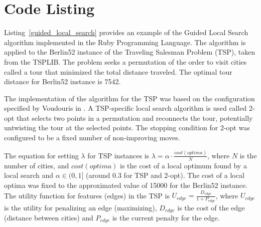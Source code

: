 \documentclass[a4paper, 11pt]{article}
\begin{document}
\section{Code Listing}
\label{sec:code}
Listing~\ref{guided_local_search} provides an example of the Guided Local Search algorithm implemented in the Ruby Programming Language. 
The algorithm is applied to the Berlin52 instance of the Traveling Salesman Problem (TSP), taken from the TSPLIB. The problem seeks a permutation of the order to visit cities called a tour that minimized the total distance traveled. The optimal tour distance for Berlin52 instance is 7542.

The implementation of the algorithm for the TSP was based on the configuration specified by Voudouris in \cite{Voudouris1997}.
A TSP-specific local search algorithm is used called 2-opt that selects two points in a permutation and reconnects the tour, potentially untwisting the tour at the selected points. The stopping condition for 2-opt was configured to be a fixed number of non-improving moves.

The equation for setting $\lambda$ for TSP instances is $\lambda = \alpha\cdot\frac{cost(optima)}{N}$, where $N$ is the number of cities, and $cost(optima)$ is the cost of a local optimum found by a local search and $\alpha\in (0,1]$ (around 0.3 for TSP and 2-opt). The cost of a local optima was fixed to the approximated value of 15000 for the Berlin52 instance. 
The utility function for features (edges) in the TSP is $U_{edge}=\frac{D_{edge}}{1+P_{edge}}$, where $U_{edge}$ is the utility for penalizing an edge (maximizing), $D_{edge}$ is the cost of the edge (distance between cities) and $P_{edge}$ is the current penalty for the edge.




\end{document}
